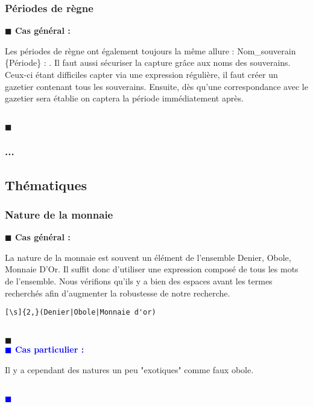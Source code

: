 \documentclass[a4paper, 11pt]{article}
\newenvironment{general}
    {
    \noindent\textbf{\textcolor{dark-blue}{$\blacksquare$  Cas général : \\}}
    }
    {
    ~\\\noindent\textcolor{dark-blue}{$\blacksquare$}\\
    }
\newenvironment{particulier}
    {
    \noindent\textbf{\textcolor{blue}{$\blacksquare$  Cas particulier : \\}}
    }
    {
    \\\noindent\textcolor{blue}{$\blacksquare$}\\
    }
\begin{document}
\subsubsection{Périodes de règne}
\begin{general}
Les périodes de règne ont également toujours la même allure : \og Nom\_souverain \{Période\} : \fg{}. Il faut aussi sécuriser la capture grâce aux noms des souverains. Ceux-ci étant difficiles capter via une expression régulière, il faut créer un gazetier contenant tous les souverains. Ensuite, dès qu'une correspondance avec le gazetier sera établie on captera la période immédiatement après.
\end{general}
\subsubsection{...}
\newpage
\subsection{Thématiques}
\subsubsection{Nature de la monnaie}
\begin{general}
La nature de la monnaie est souvent un élément de l'ensemble {Denier, Obole, Monnaie D'Or}. Il suffit donc d'utiliser une expression composé de tous les mots de l'ensemble. Nous vérifions qu'ils y a bien des espaces avant les termes recherchés afin d'augmenter la robustesse de notre recherche. 
\begin{verbatim}
[\s]{2,}(Denier|Obole|Monnaie d'or)
\end{verbatim}
\end{general}
\begin{particulier}
Il y a cependant des natures un peu "exotiques" comme faux obole.
\end{particulier}
\end{document}
